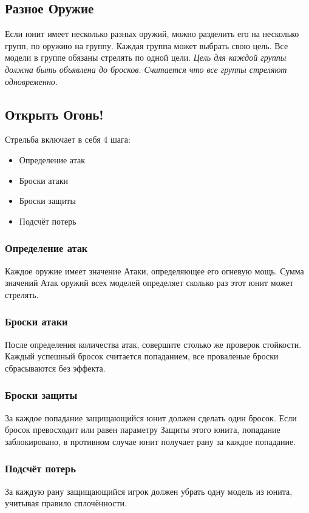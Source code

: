 \documentclass[twocolumn]{article}
\begin{document}
\subsection{Разное Оружие}
Если юнит имеет несколько разных оружий, можно разделить его на несколько групп, по оружию на группу. Каждая группа может выбрать свою цель. Все модели в группе обязаны стрелять по одной цели. \emph{Цель для каждой группы должна быть объявлена до бросков. Считается что все группы стреляют одновременно.}

\subsection{Открыть Огонь!}
Стрельба включает в себя 4 шага:
\begin{itemize}
    \item Определение атак
    \item Броски атаки
    \item Броски защиты
    \item Подсчёт потерь
\end{itemize}

\subsubsection{Определение атак}
Каждое оружие имеет значение Атаки, определяющее его огневую мощь. 
Сумма значений Атак оружий всех моделей определяет сколько раз этот юнит может стрелять.
\subsubsection{Броски атаки}
После определения количества атак, совершите столько же проверок стойкости.
Каждый успешный бросок считается попаданием, все проваленые броски сбрасываются без эффекта.
\subsubsection{Броски защиты}
За каждое попадание защищающийся юнит должен сделать один бросок. Если бросок превосходит или равен параметру Защиты этого юнита, попадание заблокировано, в противном случае юнит получает рану за каждое попадание.
\subsubsection{Подсчёт потерь}
За каждую рану защищающийся игрок должен убрать одну модель из юнита, учитывая правило сплочённости.
\end{document}
